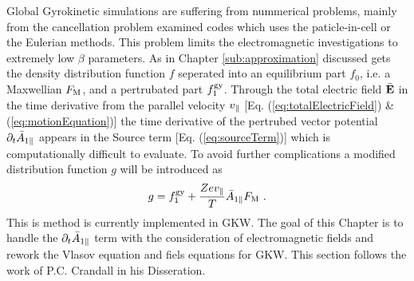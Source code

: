 Global Gyrokinetic simulations are suffering from nummerical problems, mainly from the cancellation problem examined codes which uses the paticle-in-cell or the Eulerian methods. \source This problem limits the electromagnetic investigations to extremely low $\beta$ parameters. As in Chapter \ref{sub:approximation} discussed gets the density distribution function $f$ seperated into an equilibrium part $f_0$, i.e. a Maxwellian $F_\mathrm{M}$, and a pertrubated part $f_1^{\mathrm{gy}}$. Through the total electric field $\bar{\boldsymbol{\mathbf{E}}}$ in the time derivative from the parallel velocity $v_\parallel$ [Eq. (\ref{eq:totalElectricField}) \& (\ref{eq:motionEquation})] the time derivative of the pertrubed vector potential $\partial_t \bar{A}_{1\parallel}$ appears in the Source term [Eq. (\ref{eq:sourceTerm})] which is computationally difficult to evaluate. To avoid further complications a modified distribution function $g$ will be introduced as
\begin{gather}
	g = f_1^{\mathrm{gy}} + \frac{Ze v_\parallel}{T} \bar{A}_{1\parallel} F_\mathrm{M} ~.
	\label{eq:modifiedDistrubutionFunction}
\end{gather}
This is method is currently implemented in GKW\source. The goal of this Chapter is to handle the $\partial_t \bar{A}_{1\parallel}$ term with the consideration of electromagnetic fields and rework the Vlasov equation and fiels equations for GKW. This section follows the work of P.C. Crandall in his Disseration\cite{Crandall_PHD}.
\bigskip

